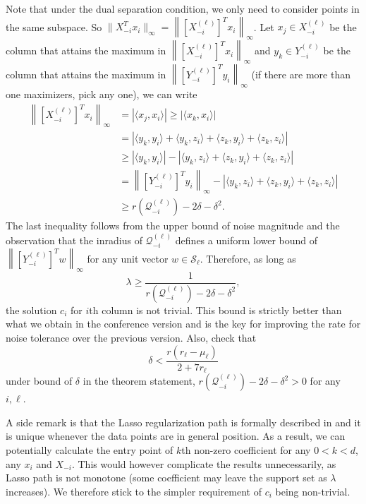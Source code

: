 \documentclass[twoside,11pt]{article}
\numberwithin{equation}{section}
\begin{document}
Note that under the dual separation condition, we only need to consider points in the same subspace. So $\|X_{-i}^Tx_i\|_{\infty} = \left\|[X_{-i}^{(\ell)}]^Tx_i\right\|_{\infty}$. Let $x_j\in X_{-i}^{(\ell)}$ be the column that attains the maximum in $\left\|[X_{-i}^{(\ell)}]^Tx_i\right\|_{\infty}$ and $y_k \in Y_{-i}^{(\ell)}$ be the column that attains the maximum in $\left\|[Y_{-i}^{(\ell)}]^Ty_i\right\|_{\infty}$ (if there are more than one maximizers, pick any one), we can write
\begin{align}
\left\|[X_{-i}^{(\ell)}]^Tx_i\right\|_{\infty}&=\left|\langle x_j, x_i\rangle\right|  \geq \left|\langle x_k, x_i\rangle\right|\nonumber\\
 &= \left|\langle y_k, y_i\rangle  + \langle y_k, z_i\rangle + \langle z_k, y_i\rangle + \langle z_k, z_i\rangle\right|\nonumber\\
&\geq \left|\langle y_k, y_i\rangle\right| - \left|\langle y_k, z_i\rangle + \langle z_k, y_i\rangle + \langle z_k, z_i\rangle\right|\nonumber\\
& = \left\|[Y_{-i}^{(\ell)}]^Ty_i\right\|_{\infty} - \left|\langle y_k, z_i\rangle + \langle z_k, y_i\rangle + \langle z_k, z_i\rangle\right|\nonumber\\
&\geq r(\mathcal{Q}^{(\ell)}_{-i}) - 2\delta - \delta^2. \label{eq:lowerbounding_max_affinity}
\end{align}
The last inequality follows from the upper bound of noise magnitude and the observation that the inradius of $\mathcal{Q}^{(\ell)}_{-i}$ defines a uniform lower bound of $\left\| [ Y_{-i}^{(\ell)}]^T w\right\|_\infty$ for any unit vector $w\in \mathcal{S}_{\ell}$. Therefore, as long as
\begin{equation}\label{eq:lambda_low}
\lambda \geq \frac{1}{ r(\mathcal{Q}^{(\ell)}_{-i}) - 2\delta - \delta^2},
\end{equation}
the solution $c_i$ for $i$th column is not trivial. This bound is strictly better than what we obtain in the conference version \citep{wang2013noisy} and is the key for improving the rate for noise tolerance over the previous version. Also, check that
\begin{equation}\label{eq:deterministic_delta}
\delta<\frac{r(r_\ell - \mu_\ell)}{2+7r_\ell}
\end{equation}
under bound of $\delta$ in the theorem statement,  $r(\mathcal{Q}^{(\ell)}_{-i}) - 2\delta - \delta^2>0$ for any $i,\ell$.

A side remark is that the Lasso regularization path is formally described in \citet{tibshirani2013lasso} and it is unique whenever the data points are in general position. As a result, we can potentially calculate the entry point of $k$th non-zero coefficient for any $0<k<d$, any $x_i$ and $X_{-i}$. This would however complicate the results unnecessarily, as Lasso path is not monotone (some coefficient may leave the support set as $\lambda$ increases). We therefore stick to the simpler requirement of $c_i$ being non-trivial.
\end{document}
